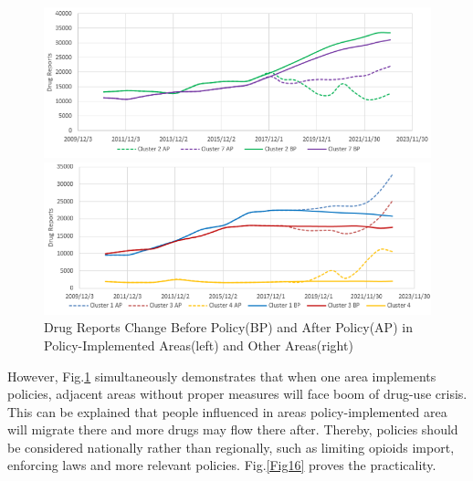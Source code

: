 \documentclass[12pt]{article}
\begin{document}
\begin{figure}[H]
	\centering %
	\begin{minipage}[b]{0.48\textwidth} %
		\centering %
		\includegraphics[scale=0.68]{./figures/13.png} %
	\end{minipage}
	\begin{minipage}[b]{0.48\textwidth} %
		\centering %
		\includegraphics[scale=0.68]{./figures/14.png}%
	\end{minipage}
	\caption{Drug Reports Change Before Policy(BP) and After Policy(AP) in Policy-Implemented Areas(left) and Other Areas(right)}
	\label{Fig14}
\end{figure}

However, Fig.\ref{Fig14} simultaneously demonstrates that when one area implements policies, adjacent areas without proper measures will face boom of drug-use crisis. This can be explained that people influenced in areas policy-implemented area will migrate there and more drugs may flow there after. Thereby, policies should be considered nationally rather than regionally, such as limiting opioids import, enforcing laws and more relevant policies. Fig.\ref{Fig16} proves the practicality.
\end{document}
